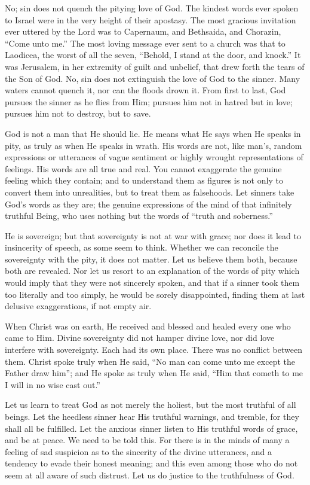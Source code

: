 \documentclass[
]{book}
\begin{document}
No; sin does not quench the pitying love of God. The kindest words ever spoken to Israel were in the very height of their apostasy. The most gracious invitation ever uttered by the Lord was to Capernaum, and Bethsaida, and Chorazin, ``Come unto me.'' The most loving message ever sent to a church was that to Laodicea, the worst of all the seven, ``Behold, I stand at the door, and knock.'' It was Jerusalem, in her extremity of guilt and unbelief, that drew forth the tears of the Son of God. No, sin does not extinguish the love of God to the sinner. Many waters cannot quench it, nor can the floods drown it. From first to last, God pursues the sinner as he flies from Him; pursues him not in hatred but in love; pursues him not to destroy, but to save.

God is not a man that He should lie. He means what He says when He speaks in pity, as truly as when He speaks in wrath. His words are not, like man's, random expressions or utterances of vague sentiment or highly wrought representations of feelings. His words are all true and real. You cannot exaggerate the genuine feeling which they contain; and to understand them as figures is not only to convert them into unrealities, but to treat them as falsehoods. Let sinners take God's words as they are; the genuine expressions of the mind of that infinitely truthful Being, who uses nothing but the words of ``truth and soberness.''

He is sovereign; but that sovereignty is not at war with grace; nor does it lead to insincerity of speech, as some seem to think. Whether we can reconcile the sovereignty with the pity, it does not matter. Let us believe them both, because both are revealed. Nor let us resort to an explanation of the words of pity which would imply that they were not sincerely spoken, and that if a sinner took them too literally and too simply, he would be sorely disappointed, finding them at last delusive exaggerations, if not empty air.

When Christ was on earth, He received and blessed and healed every one who came to Him. Divine sovereignty did not hamper divine love, nor did love interfere with sovereignty. Each had its own place. There was no conflict between them. Christ spoke truly when He said, ``No man can come unto me except the Father draw him''; and He spoke as truly when He said, ``Him that cometh to me I will in no wise cast out.''

Let us learn to treat God as not merely the holiest, but the most truthful of all beings. Let the heedless sinner hear His truthful warnings, and tremble, for they shall all be fulfilled. Let the anxious sinner listen to His truthful words of grace, and be at peace. We need to be told this. For there is in the minds of many a feeling of sad suspicion as to the sincerity of the divine utterances, and a tendency to evade their honest meaning; and this even among those who do not seem at all aware of such distrust. Let us do justice to the truthfulness of God.
\end{document}
